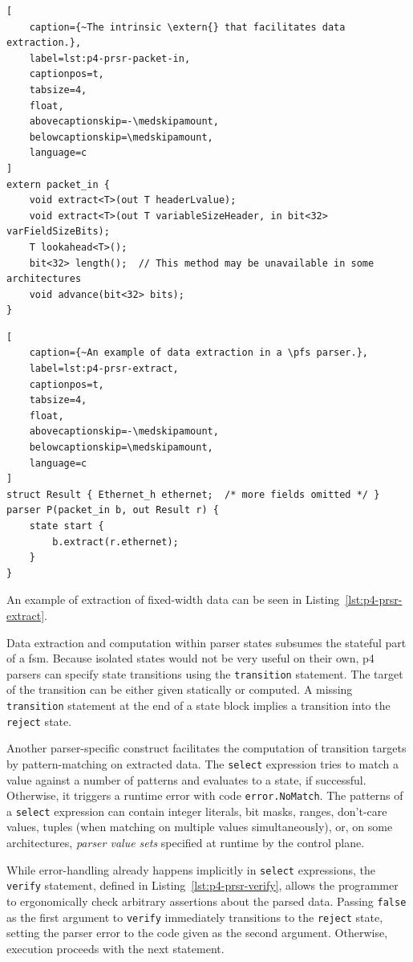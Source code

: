 \begin{lstlisting}[
	caption={~The intrinsic \extern{} that facilitates data extraction.},
	label=lst:p4-prsr-packet-in,
	captionpos=t,
	tabsize=4,
	float,
	abovecaptionskip=-\medskipamount,
	belowcaptionskip=\medskipamount,
	language=c
]
extern packet_in {
	void extract<T>(out T headerLvalue);
	void extract<T>(out T variableSizeHeader, in bit<32> varFieldSizeBits);
	T lookahead<T>();
	bit<32> length();  // This method may be unavailable in some architectures
	void advance(bit<32> bits);
}
\end{lstlisting}

\begin{lstlisting}[
	caption={~An example of data extraction in a \pfs parser.},
	label=lst:p4-prsr-extract,
	captionpos=t,
	tabsize=4,
	float,
	abovecaptionskip=-\medskipamount,
	belowcaptionskip=\medskipamount,
	language=c
]
struct Result { Ethernet_h ethernet;  /* more fields omitted */ }
parser P(packet_in b, out Result r) {
	state start {
		b.extract(r.ethernet);
	}
}
\end{lstlisting}

An example of extraction of fixed-width data can be seen in
Listing~\ref{lst:p4-prsr-extract}.

Data extraction and computation within parser states subsumes the stateful part
of a \acrlong{fsm}. Because isolated states would not be very useful on their
own, \acrshort{p4} parsers can specify state transitions using the
\texttt{transition} statement. The target of the transition can be either given
statically or computed. A missing \texttt{transition} statement at the end of a
state block implies a transition into the \texttt{reject} state.

Another parser-specific construct facilitates the computation of transition
targets by pattern-matching on extracted data. The \texttt{select} expression
tries to match a value against a number of patterns and evaluates to a state, if
successful. Otherwise, it triggers a runtime error with code
\texttt{error.NoMatch}. The patterns of a \texttt{select} expression can contain
integer literals, bit masks, ranges, don't-care values, tuples (when matching on
multiple values simultaneously), or, on some architectures, \textit{parser value
sets} specified at runtime by the control plane.

While error-handling already happens implicitly in \texttt{select} expressions,
the \texttt{verify} statement, defined in Listing~\ref{lst:p4-prsr-verify},
allows the programmer to ergonomically check arbitrary assertions about the
parsed data. Passing \texttt{false} as the first argument to \texttt{verify}
immediately transitions to the \texttt{reject} state, setting the parser error
to the code given as the second argument. Otherwise, execution proceeds with the
next statement.

